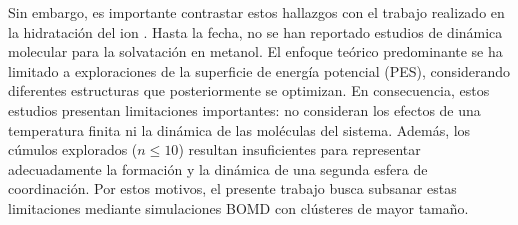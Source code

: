 Sin embargo, es importante contrastar estos hallazgos con el trabajo realizado en la hidratación del ion . Hasta la fecha, no se han reportado estudios de dinámica molecular para la solvatación en metanol. El enfoque teórico predominante se ha limitado a exploraciones de la superficie de energía potencial (PES), considerando diferentes estructuras que posteriormente se optimizan. En consecuencia, estos estudios presentan limitaciones importantes: no consideran los efectos de una temperatura finita ni la dinámica de las moléculas del sistema. Además, los cúmulos explorados ($n \le 10$) resultan insuficientes para representar adecuadamente la formación y la dinámica de una segunda esfera de coordinación. Por estos motivos, el presente trabajo busca subsanar estas limitaciones mediante simulaciones BOMD con clústeres de mayor tamaño.


